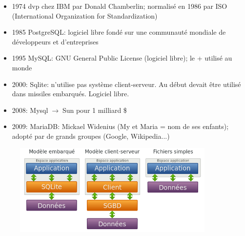 \documentclass[a4paper,11pt]{article}
\begin{document}
\begin{Form}
\begin{commentprof}
\begin{itemize}
\item 1974 dvp chez IBM par Donald Chamberlin; normalisé en 1986 par ISO (International Organization for Standardization)
\item 1985 PostgreSQL: logiciel libre fondé sur une communauté mondiale de développeurs et d'entreprises
\item 1995 MySQL: GNU General Public License (logiciel libre); le + utilisé au monde
\item 2000: Sqlite: n'utilise pas système client-serveur. Au début devait être utilisé dans missiles embarqués. Logiciel libre.
\item 2008: Mysql$\;\rightarrow\;$Sun pour 1 milliard \$
\item 2009: MariaDB: Mickael Widenius (My et Maria = nom de ses enfants); adopté par de grands groupes (Google, Wikipedia...)
\end{itemize}
\end{commentprof}
\begin{figure}[!h]
\centering
\includegraphics[width=10cm]{ressources/modeles.png}
\label{modeles}
\end{figure}

\end{Form}
\end{document}
